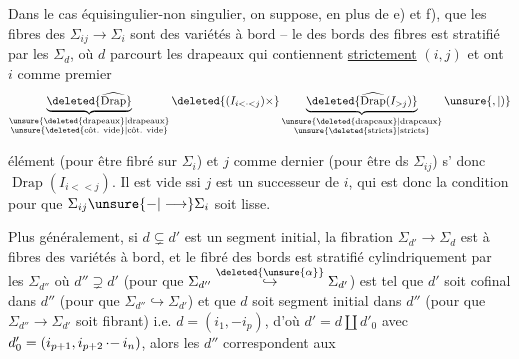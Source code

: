Dans le cas équisingulier-non singulier, on suppose, en plus de e) et f), que les fibres des  $\Sigma_{ij}\longrightarrow\Sigma_i$ sont des variétés à bord -- le   des bords des fibres est  stratifié par les $\Sigma_d$, où $d$  parcourt les drapeaux qui contiennent \uline{strictement} \deleted{$\unsure{\Sigma}$} $(i,j)$ et ont $i$ comme premier
\[
\underbrace{\deleted{\widehat{\operatorname{Drap}}}}_{\substack{\text{\unsure{\deleted{drapeaux}|drapeaux}}\\\text{\unsure{\deleted{côt. vide}|côt. vide}}}}\deleted{(I_{i<\cdot<j})\times}
\underbrace{\deleted{\widehat{\operatorname{Drap}}(I_{>j})}}_{\substack{\text{\unsure{\deleted{drapeaux}|drapeaux}}\\\text{\unsure{\deleted{stricts}|stricts}}}}\unsure{,|)}
\]



élément (pour être fibré sur $\Sigma_i$) et $j$ comme dernier (pour être  ds $\Sigma_{ij}$) s' donc \inserted{$\simeq$} $\operatorname{Drap}(I_{i< <j})$. Il est vide ssi $j$ est un successeur de $i$, qui est donc la condition pour que $\Sigma_{ij}\unsure{-|\longrightarrow}\Sigma_i$ soit lisse.

Plus généralement, si $d\subsetneq d'$ est un segment initial, la fibration $\Sigma_{d'}\longrightarrow\Sigma_d$ est à fibres des variétés à bord, et le fibré des bords est stratifié cylindriquement par les $\Sigma_{d''}$ où $d''\supsetneq d'$ (pour que $\Sigma_{d''}\overset{\deleted{\unsure{\alpha}}}{\hookrightarrow}\Sigma_{d'}$) est tel que $d'$ soit cofinal dans $d''$ (pour que $\Sigma_{d''}\hookrightarrow\Sigma_{d'}$) et que $d$ soit segment initial dans $d''$ (pour que $\Sigma_{d''}\longrightarrow\Sigma_{d'}$ soit fibrant) i.e.  
$d=(i_1,-i_p)$,  d'où $d'=d\coprod d'_0$
avec $d'_0=(i_{p+1},i_{p+2}\mathinner{\cdot-}i_n)$, alors les $d''$ correspondent aux

